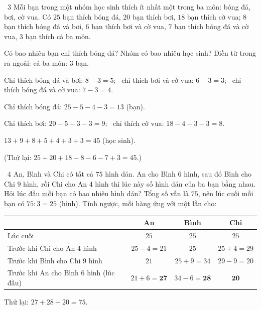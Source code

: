 \gap
\begin{exbox}{\ExWord\ 3}
Mỗi bạn trong một nhóm học sinh thích ít nhất một trong ba môn: bóng đá, bơi, cờ vua. Có $25$ bạn thích bóng đá, $20$ bạn thích bơi, $18$ bạn thích cờ vua; $8$ bạn thích bóng đá và bơi, $6$ bạn thích bơi và cờ vua, $7$ bạn thích bóng đá và cờ vua, $3$ bạn thích cả ba môn.\par
{} Có bao nhiêu bạn chỉ thích bóng đá? \quad {} Nhóm có bao nhiêu học sinh?
\guide
Điền từ trong ra ngoài: cả ba môn: $3$ bạn.\par
Chỉ thích bóng đá và bơi: $8-3=5$; \ chỉ thích bơi và cờ vua: $6-3=3$; \ chỉ thích bóng đá và cờ vua: $7-3=4$.\par
{} Chỉ thích bóng đá: $25-5-4-3=13$ (bạn).\par
Chỉ thích bơi: $20-5-3-3=9$; \ chỉ thích cờ vua: $18-4-3-3=8$.
\begin{center}
\end{center}
 $13+9+8+5+4+3+3=45$ (học sinh).\par
(Thử lại: $25+20+18-8-6-7+3=45$.)
\end{exbox}
\gap
\begin{exbox}{\ExWord\ 4}
An, Bình và Chi có tất cả $75$ hình dán. An cho Bình $6$ hình, sau đó Bình cho Chi $9$ hình, rồi Chi cho An $4$ hình thì lúc này số hình dán của ba bạn bằng nhau. Hỏi lúc đầu mỗi bạn có bao nhiêu hình dán?
\guide
Tổng số vẫn là $75$, nên lúc cuối mỗi bạn có $75:3=25$ (hình). Tính ngược, mỗi hàng ứng với một lần cho:
\begin{center}
\renewcommand{\arraystretch}{1.25}
\begin{tabular}{|l|c|c|c|}
\hline
 & An & Bình & Chi\\\hline
Lúc cuối & $25$ & $25$ & $25$\\\hline
Trước khi Chi cho An $4$ hình & $25-4=21$ & $25$ & $25+4=29$\\\hline
Trước khi Bình cho Chi $9$ hình & $21$ & $25+9=34$ & $29-9=20$\\\hline
Trước khi An cho Bình $6$ hình (lúc đầu) & $21+6=\mathbf{27}$ & $34-6=\mathbf{28}$ & $\mathbf{20}$\\\hline
\end{tabular}
\end{center}
Thử lại: $27+28+20=75$.
\end{exbox}
